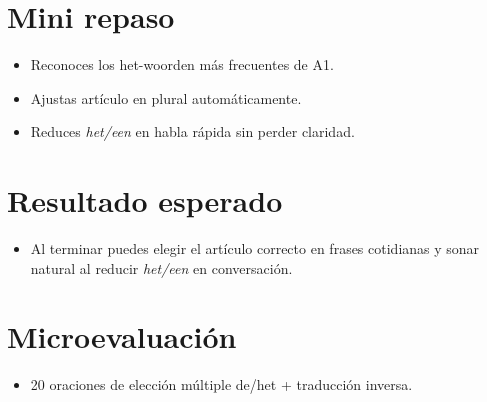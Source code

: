\section{Mini repaso}
\begin{itemize}[leftmargin=*]
	\item Reconoces los het-woorden más frecuentes de A1.
	\item Ajustas artículo en plural automáticamente.
	\item Reduces \textit{het/een} en habla rápida sin perder claridad.
\end{itemize}

\section{Resultado esperado}
\begin{itemize}[leftmargin=*]
	\item Al terminar puedes elegir el artículo correcto en frases cotidianas y sonar natural al reducir \textit{het/een} en conversación.
\end{itemize}

\section{Microevaluación}
\begin{itemize}[leftmargin=*]
	\item 20 oraciones de elección múltiple de/het + traducción inversa.
\end{itemize}
